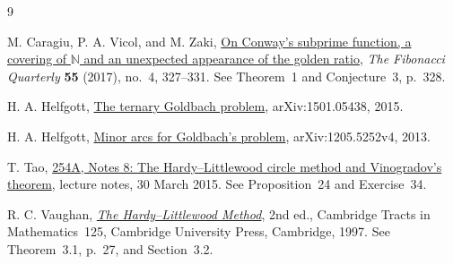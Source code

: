 \documentclass[11pt,letterpaper]{article}
\numberwithin{equation}{section}
\theoremstyle{definition}
\theoremstyle{remark}
\newcommand{\N}{\mathbb N}
\begin{document}
\begin{thebibliography}{9}

M. Caragiu, P. A. Vicol, and M. Zaki,
\href{https://www.fq.math.ca/Papers1/55-4/CaragiuVicolZaki03162017.pdf}
{On Conway's subprime function, a covering of $\N$ and an unexpected
appearance of the golden ratio},
\emph{The Fibonacci Quarterly} \textbf{55} (2017), no.~4, 327--331.
See Theorem~1 and Conjecture~3, p.~328.

H. A. Helfgott,
\href{https://arxiv.org/abs/1501.05438}
{The ternary Goldbach problem},
arXiv:1501.05438, 2015.

H. A. Helfgott,
\href{https://arxiv.org/abs/1205.5252v4}
{Minor arcs for Goldbach's problem},
arXiv:1205.5252v4, 2013.

T. Tao,
\href{https://terrytao.wordpress.com/2015/03/30/254a-notes-8-the-hardy-littlewood-circle-method-and-vinogradovs-theorem/}
{254A, Notes 8: The Hardy--Littlewood circle method and Vinogradov's theorem},
lecture notes, 30 March 2015.
See Proposition~24 and Exercise~34.

R. C. Vaughan,
\href{https://www.cambridge.org/core/books/the-hardy-littlewood-method/5B45E102D5AFAD6FADDD66E4B510E7FA}
{\emph{The Hardy--Littlewood Method}},
2nd ed., Cambridge Tracts in Mathematics~125,
Cambridge University Press, Cambridge, 1997.
See Theorem~3.1, p.~27, and Section~3.2.

\end{thebibliography}
\end{document}
